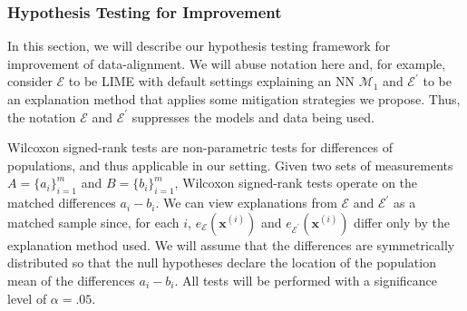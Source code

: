 \documentclass[mnsc,blindrev]{informs3}
\newcommand{\mE}{\mathcal{E}}
\begin{document}
        \subsubsection{Hypothesis Testing for Improvement}
            \label{apx_sec:hypothesis_testing}
            In this section, we will describe our hypothesis testing framework for improvement of data-alignment. We will abuse notation here and, for example, consider $\mE$ to be LIME with default settings explaining an NN $\mathcal{M}_1$ and $\mE^\prime$ to be an explanation method that applies some mitigation strategies we propose. Thus, the notation $\mE$ and $\mE^\prime$ suppresses the models and data being used.
            
            Wilcoxon signed-rank tests are non-parametric tests for differences of populations, and thus applicable in our setting. Given two sets of measurements $A=\{a_i\}_{i=1}^m$ and $B=\{b_i\}_{i=1}^m$, Wilcoxon signed-rank tests operate on the matched differences $a_i-b_i$. We can view explanations from $\mE$ and $\mE^\prime$ as a matched sample since, for each $i$, $e_{\mE}(\mathbf{x}^{(i)})$ and $e_{\mE^\prime}(\mathbf{x}^{(i)})$ differ only by the explanation method used. We will assume that the differences are symmetrically distributed so that the null hypotheses declare the location of the population mean of the differences $a_i - b_i$. All tests will be performed with a significance level of $\alpha=.05$.
\end{document}
